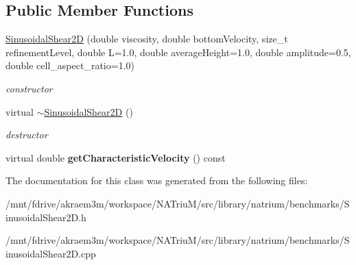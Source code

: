 \subsection*{Public Member Functions}
\begin{DoxyCompactItemize}
\item 
\hypertarget{classnatrium_1_1SinusoidalShear2D_a795ec020c20dac79280c1eec89bb8b11}{
\hyperlink{classnatrium_1_1SinusoidalShear2D_a795ec020c20dac79280c1eec89bb8b11}{SinusoidalShear2D} (double viscosity, double bottomVelocity, size\_\-t refinementLevel, double L=1.0, double averageHeight=1.0, double amplitude=0.5, double cell\_\-aspect\_\-ratio=1.0)}
\label{classnatrium_1_1SinusoidalShear2D_a795ec020c20dac79280c1eec89bb8b11}

\begin{DoxyCompactList}\small\item\em constructor \item\end{DoxyCompactList}\item 
\hypertarget{classnatrium_1_1SinusoidalShear2D_a7aaf185e32e29f1f50b3f9db9c213a2c}{
virtual \hyperlink{classnatrium_1_1SinusoidalShear2D_a7aaf185e32e29f1f50b3f9db9c213a2c}{$\sim$SinusoidalShear2D} ()}
\label{classnatrium_1_1SinusoidalShear2D_a7aaf185e32e29f1f50b3f9db9c213a2c}

\begin{DoxyCompactList}\small\item\em destructor \item\end{DoxyCompactList}\item 
\hypertarget{classnatrium_1_1SinusoidalShear2D_af1162ca66457ddfa460f379f1544a5f5}{
virtual double {\bfseries getCharacteristicVelocity} () const }
\label{classnatrium_1_1SinusoidalShear2D_af1162ca66457ddfa460f379f1544a5f5}

\end{DoxyCompactItemize}


The documentation for this class was generated from the following files:\begin{DoxyCompactItemize}
\item 
/mnt/fdrive/akraem3m/workspace/NATriuM/src/library/natrium/benchmarks/SinusoidalShear2D.h\item 
/mnt/fdrive/akraem3m/workspace/NATriuM/src/library/natrium/benchmarks/SinusoidalShear2D.cpp\end{DoxyCompactItemize}
